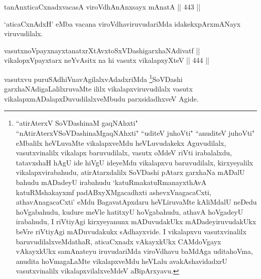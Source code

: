 \begin{shl}
tanAnxticaCxnadxvacasA viroVdhAnAnxsayx mAnatA \hfill || 443 || 
\end{shl}

\begin{artha}
`aticaCxnAdxH' eMba vacana viroVdhaviruvudariMda idakekx\break pArxmANayx viruvudilalx.
\end{artha}


\begin{shl}
vasutxnoV\s payxnayxtanatxrXtAvxtoSxVDashigarxhaNAdivatf || \\
vikalopxV\s payxtarx neYvAsitx na hi vasutx vikalapxyXteV \hfill || 444 || 
\end{shl}

\begin{artha}
vasutxvu puruSAdhiVnavAgilalxvAdadxriMda \footnote{``atirAterxV SoVDashinaM gaqNAhxti" ``nAtirAterxVSoVDashinaMgaqNAhxti" ``uditeV juhoVti" ``anuditeV juhoVti" eMbalilx heVLuvaMte vikalapxveMdu heVLuvudakekx Aguvudilalx, vasutxvinalilx vikalapx baruvudilalx, vasutx oMdeV riVti irabalalxdu, tatavxshaH hAgU ide hiVgU ideyeMdu vikalapxvu baruvudilalx, kirxyeyalilx vikalapxvirabahudu, atirAtarxdalilx SoVDashi pAtarx garxhaNa mADalU bahudu mADadeyU irabahudu `katuRmakatuRmanayxthAvA katuRMshakayxmf padABxyXMgacadhxti ashevxVnagacaCxti, athavAnagacaCxti' eMdu BagavatApxdaru heVLiruvaMte kAliMdalU neDedu hoVgabahudu, kudure meVle hatitxyU hoVgabahudu, athavA hoVgadeyU irabahudu, I riVtiyAgi kirxyeyanunx mADuvudakUkx mADadeyiruvudakUkx beVre riVtiyAgi mADuvudakukx sAdhayxvide. I vikalapxvu vasutxvinalilx baruvudilalxveMdathaR, aticaCxnadx vAkayxkUkx CAMdoVgayx vAkayxkUkx samAnateyu iruvudariMda viroVdhavu baMdAga uditahoVma, anudita hoVmagaLaMte vikalapxveMdu heVLalu avakAshavidadxrU vasutxvinalilx vikalapxvilalxveMdeV aBipArxyavu.}SoVDashi garxhaNAdigaLalilxruvaMte ililx vikalapxviruvudilalx vasutx vikalapxmADalapxDuvudilalxveMbudu parxsidadhxveV Agide.
\end{artha}



